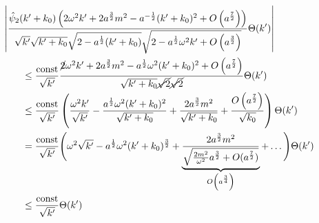 \begin{align}
&\kern -2em
    \left|
    \frac{
        \hat\psi_2(k'+k_0) \left(
        2 \omega^2 k' + 2a^{\frac{3}{2}}m^2-a^{-\frac{1}{2}}(k'+k_0)^2
            + O \left(a^{\frac{7}{2}}\right)
        \right)
    }
    {
        \sqrt{k'} \sqrt{k'+k_0} \sqrt{2-a^{\frac{1}{2}}(k'+k_0)}
        \sqrt{2-a^{\frac{1}{2}}\omega^2 k' + O\left(a^{\frac{3}{2}}\right)}
    }
    \Theta(k')
    \right|
    \nonumber \\ &\leq
    \frac{\textrm{const}}{\sqrt{k'}}
    \frac{
        \cancel{2}\omega^2 k' + 2a^{\frac{3}{2}}m^2
        -a^{\frac{1}{2}} \omega^2 (k'+k_0)^2 + O\left(a^{\frac{7}{2}}\right)
    }
    {
        \sqrt{k' + k_0}\cancel{\sqrt{2}} \cancel{\sqrt{2}}
    }\Theta(k')
    \nonumber \\ &\leq
    \frac{\textrm{const}}{\sqrt{k'}}
    \left(
        \frac{\omega^2 k'}{\sqrt{k'}}
        - \frac{a^{\frac{1}{2}}\omega^2(k'+k_0)^2}{\sqrt{k'+k_0}}
        + \frac{2a^{\frac{3}{2}}m^2}{\sqrt{k'+k_0}}
        + \frac{O\left(a^{\frac{7}{2}}\right)}{\sqrt{k_0}}
    \right)\Theta(k')
    \nonumber \\ &=
    \frac{\textrm{const}}{\sqrt{k'}}
    \Bigg(
        \omega^2 \sqrt{k'} - a^{\frac{1}{2}}\omega^2 (k'+k_0)^{\frac{3}{2}}
        + \underbrace{\frac{2a^{\frac{3}{2}}m^2}
                    {\sqrt{\frac{2m^2}{\omega^2}a^{\frac{3}{2}}+O(a^{\frac{7}{2}})}}}_{O\left(a^{\frac{3}{4}}\right)}
        + \dots
    \Bigg)\Theta(k')
    \nonumber \\&\leq
    \frac{\textrm{const}}{\sqrt{k'}}\Theta(k')
    \label{eq:lange_1/sqrt_abschaetzerei}
\end{align}

